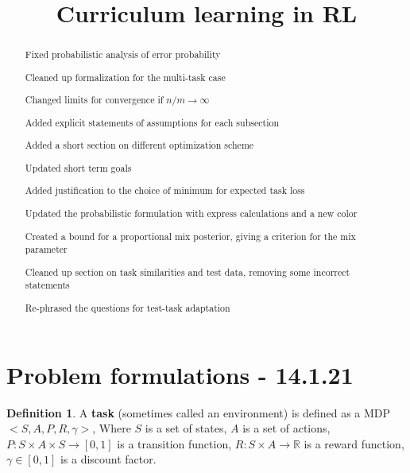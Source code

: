 \documentclass[letterpaper]{article}
\title{Curriculum learning in RL}
\theoremstyle{definition}
\newtheorem{defn}{Definition}[section]
\begin{document}
	
	\maketitle
	\begin{abstract}
		
		Fixed probabilistic analysis of error probability
		
		Cleaned up formalization for the multi-task case
		
		Changed limits for convergence if $n/m\rightarrow\infty$
		
		Added explicit statements of assumptions for each subsection
		
		Added a short section on different optimization scheme
		
		Updated short term goals
		
		Added justification to the choice of minimum for expected task loss
		
		Updated the probabilistic formulation with express calculations and a new color
		
		Created a bound for a proportional mix posterior, giving a criterion for the mix parameter
		
		Cleaned up section on task similarities and test data, removing some incorrect statements
		
		Re-phrased the questions for test-task adaptation
		
		
	\end{abstract}

\tableofcontents

\section{Problem formulations - 14.1.21} \label{sec:formulation}
\begin{defn}
	A \textbf{task} (sometimes called an environment) is defined as a MDP $<S,A,P,R,\gamma>$,
	Where $S$ is a set of states, $A$ is a set of actions, $P:S\times A\times S\rightarrow [0,1]$ is a transition function, 
	$R:S\times A\rightarrow \mathbb{R}$ is a reward function, $\gamma\in[0,1]$ is a discount factor.
\end{defn}
\end{document}
